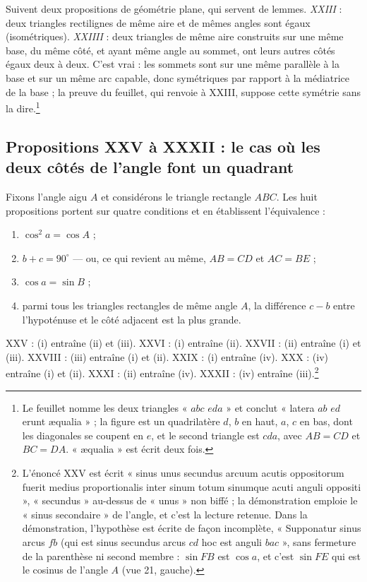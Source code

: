 \documentclass[11pt,a4paper]{article}
\begin{document}
Suivent deux propositions de géométrie plane, qui servent de lemmes.
\emph{XXIII} : deux triangles rectilignes de même aire et de mêmes angles sont
égaux (isométriques). \emph{XXIIII} : deux triangles de même aire construits sur une
même base, du même côté, et ayant même angle au sommet, ont leurs autres côtés
égaux deux à deux. C'est vrai : les sommets sont sur une même parallèle à la base
et sur un même arc capable, donc symétriques par rapport à la médiatrice de la
base ; la preuve du feuillet, qui renvoie à XXIII, suppose cette symétrie sans la
dire.\footnote{Le feuillet nomme les deux triangles « $abc$ $eda$ » et conclut
« latera $ab$ $ed$ erunt æqualia » ; la figure est un quadrilatère $d$, $b$ en
haut, $a$, $c$ en bas, dont les diagonales se coupent en $e$, et le second
triangle est $cda$, avec $AB = CD$ et $BC = DA$. « æqualia » est écrit deux fois.}

\subsection*{Propositions XXV à XXXII : le cas où les deux côtés de l'angle font un quadrant}

Fixons l'angle aigu $A$ et considérons le triangle rectangle $ABC$. Les huit
propositions portent sur quatre conditions et en établissent l'équivalence :

\begin{enumerate}
  \item[(i)] $\cos^2 a = \cos A$ ;
  \item[(ii)] $b + c = 90^\circ$ — ou, ce qui revient au même, $AB = CD$ et
    $AC = BE$ ;
  \item[(iii)] $\cos a = \sin B$ ;
  \item[(iv)] parmi tous les triangles rectangles de même angle $A$, la
    différence $c - b$ entre l'hypoténuse et le côté adjacent est la plus
    grande.
\end{enumerate}

XXV : (i) entraîne (ii) et (iii). XXVI : (i) entraîne (ii). XXVII : (ii)
entraîne (i) et (iii). XXVIII : (iii) entraîne (i) et (ii). XXIX : (i) entraîne
(iv). XXX : (iv) entraîne (i) et (ii). XXXI : (ii) entraîne (iv). XXXII : (iv)
entraîne (iii).\footnote{L'énoncé XXV est écrit « sinus unus secundus arcuum
acutis oppositorum fuerit medius proportionalis inter sinum totum sinumque acuti
anguli oppositi », « secundus » au-dessus de « unus » non biffé ; la démonstration
emploie le « sinus secondaire » de l'angle, et c'est la lecture retenue. Dans la
démonstration, l'hypothèse est écrite de façon incomplète, « Supponatur sinus
arcus $fb$ (qui est sinus secundus arcus $cd$ hoc est anguli $bac$ », sans
fermeture de la parenthèse ni second membre : $\sin FB$ est $\cos a$, et c'est
$\sin FE$ qui est le cosinus de l'angle $A$ (vue 21, gauche).}
\end{document}
